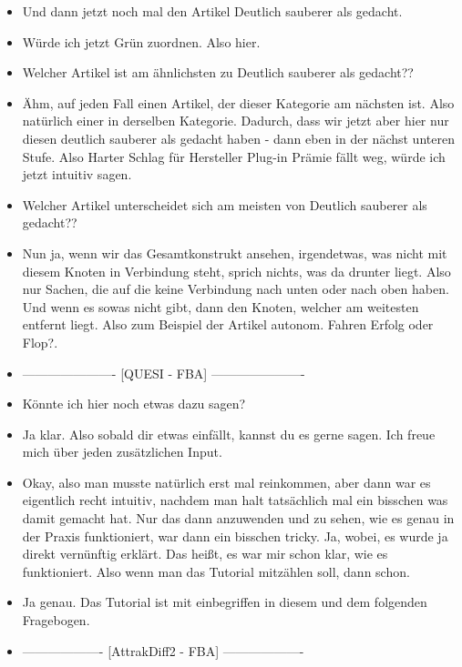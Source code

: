 {\begin{itemize}[]
    \item {} Und dann jetzt noch mal den Artikel \flqq Deutlich sauberer als gedacht\frqq{}.
    \item {} Würde ich jetzt Grün zuordnen. Also hier.
    \item {} Welcher Artikel ist am ähnlichsten zu \flqq Deutlich sauberer als gedacht?\frqq{}?
    \item {} Ähm, auf jeden Fall einen Artikel, der dieser Kategorie am nächsten ist.
    Also natürlich einer in derselben Kategorie.
    Dadurch, dass wir jetzt aber hier nur diesen deutlich sauberer als gedacht haben - dann eben in der nächst unteren Stufe.
    Also \flqq Harter Schlag für Hersteller Plug-in Prämie fällt weg\frqq{}, würde ich jetzt intuitiv sagen.
    \item {} Welcher Artikel unterscheidet sich am meisten von \flqq Deutlich sauberer als gedacht?\frqq{}?
    \item {} Nun ja, wenn wir das Gesamtkonstrukt ansehen, irgendetwas, was nicht mit diesem Knoten in Verbindung steht, sprich nichts, was da drunter liegt.
    Also nur Sachen, die auf die keine Verbindung nach unten oder nach oben haben.
    Und wenn es sowas nicht gibt, dann den Knoten, welcher am weitesten entfernt liegt.
    Also zum Beispiel der Artikel \flqq autonom. Fahren Erfolg oder Flop?\frqq{}.
    \item {----------------------} [QUESI - FBA] {----------------------}
    \item {} Könnte ich hier noch etwas dazu sagen?
    \item {} Ja klar. Also sobald dir etwas einfällt, kannst du es gerne sagen. Ich freue mich über jeden zusätzlichen Input.
    \item {} Okay, also man musste natürlich erst mal reinkommen, aber dann war es eigentlich recht intuitiv, nachdem man halt tatsächlich mal ein bisschen was damit gemacht hat.
    Nur das dann anzuwenden und zu sehen, wie es genau in der Praxis funktioniert, war dann ein bisschen tricky. 
    Ja, wobei, es wurde ja direkt vernünftig erklärt.
    Das heißt, es war mir schon klar, wie es funktioniert. 
    Also wenn man das Tutorial mitzählen soll, dann schon.
    \item {} Ja genau. Das Tutorial ist mit einbegriffen in diesem und dem folgenden Fragebogen.
    \item {-------------------} [AttrakDiff2 - FBA] {-------------------}

\end{itemize}}
